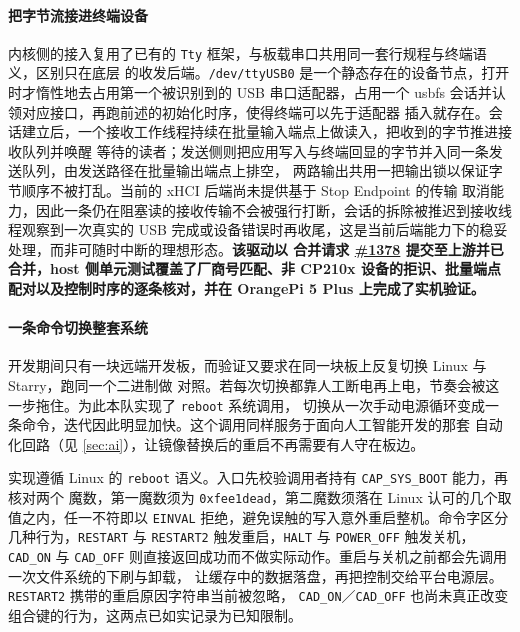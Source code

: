 \paragraph{把字节流接进终端设备}
内核侧的接入复用了已有的 \texttt{Tty} 框架，与板载串口共用同一套行规程与终端语义，区别只在底层
的收发后端。\texttt{/dev/ttyUSB0} 是一个静态存在的设备节点，打开时才惰性地去占用第一个被识别到的
USB 串口适配器，占用一个 usbfs 会话并认领对应接口，再跑前述的初始化时序，使得终端可以先于适配器
插入就存在。会话建立后，一个接收工作线程持续在批量输入端点上做读入，把收到的字节推进接收队列并唤醒
等待的读者；发送侧则把应用写入与终端回显的字节并入同一条发送队列，由发送路径在批量输出端点上排空，
两路输出共用一把输出锁以保证字节顺序不被打乱。当前的 xHCI 后端尚未提供基于 Stop Endpoint 的传输
取消能力，因此一条仍在阻塞读的接收传输不会被强行打断，会话的拆除被推迟到接收线程观察到一次真实的
USB 完成或设备错误时再收尾，这是当前后端能力下的稳妥处理，而非可随时中断的理想形态。\textbf{该驱动以
合并请求 \href{https://github.com/rcore-os/tgoskits/pull/1378}{\#1378} 提交至上游并已合并，host
侧单元测试覆盖了厂商号匹配、非 CP210x 设备的拒识、批量端点配对以及控制时序的逐条核对，并在
OrangePi 5 Plus 上完成了实机验证。}

\paragraph{一条命令切换整套系统}
开发期间只有一块远端开发板，而验证又要求在同一块板上反复切换 Linux 与 Starry，跑同一个二进制做
对照。若每次切换都靠人工断电再上电，节奏会被这一步拖住。为此本队实现了 \texttt{reboot} 系统调用，
切换从一次手动电源循环变成一条命令，迭代因此明显加快。这个调用同样服务于面向人工智能开发的那套
自动化回路（见 \ref{sec:ai}），让镜像替换后的重启不再需要有人守在板边。

实现遵循 Linux 的 \texttt{reboot} 语义。入口先校验调用者持有 \texttt{CAP\_SYS\_BOOT} 能力，再核对两个
魔数，第一魔数须为 \texttt{0xfee1dead}，第二魔数须落在 Linux 认可的几个取值之内，任一不符即以
\texttt{EINVAL} 拒绝，避免误触的写入意外重启整机。命令字区分几种行为，\texttt{RESTART} 与
\texttt{RESTART2} 触发重启，\texttt{HALT} 与 \texttt{POWER\_OFF} 触发关机，\texttt{CAD\_ON} 与
\texttt{CAD\_OFF} 则直接返回成功而不做实际动作。重启与关机之前都会先调用一次文件系统的下刷与卸载，
让缓存中的数据落盘，再把控制交给平台电源层。\texttt{RESTART2} 携带的重启原因字符串当前被忽略，
\texttt{CAD\_ON}／\texttt{CAD\_OFF} 也尚未真正改变组合键的行为，这两点已如实记录为已知限制。


